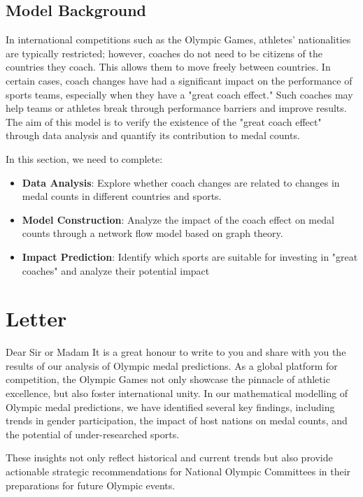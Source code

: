 \documentclass{mcmthesis}
\begin{document}
\subsection{Model Background}
In international competitions such as the Olympic Games, athletes' nationalities are typically restricted; however, coaches do not need to be citizens of the countries they coach. This allows them to move freely between countries. In certain cases, coach changes have had a significant impact on the performance of sports teams, especially when they have a "great coach effect." Such coaches may help teams or athletes break through performance barriers and improve results. The aim of this model is to verify the existence of the "great coach effect" through data analysis and quantify its contribution to medal counts.

In this section, we need to complete:
\begin{itemize}
    \item 	{\bf Data Analysis}: Explore whether coach changes are related to changes in medal counts in different countries and sports.
    \item	{\bf Model Construction}: Analyze the impact of the coach effect on medal counts through a network flow model based on graph theory.
    \item	{\bf Impact Prediction}: Identify which sports are suitable for investing in "great coaches" and analyze their potential impact
\end{itemize}








\section{Letter}
Dear Sir or Madam
It is a great honour to write to you and share with you the results of our analysis of Olympic medal predictions. As a global platform for competition, the Olympic Games not only showcase the pinnacle of athletic excellence, but also foster international unity. In our mathematical modelling of Olympic medal predictions, we have identified several key findings, including trends in gender participation, the impact of host nations on medal counts, and the potential of under-researched sports.

These insights not only reflect historical and current trends but also provide actionable strategic recommendations for National Olympic Committees in their preparations for future Olympic events. 
\end{document}
